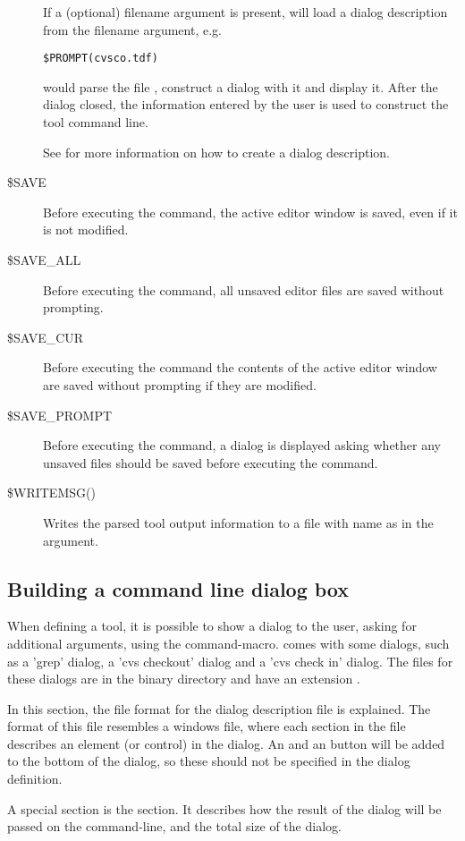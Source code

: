\begin{description}
If a (optional) filename argument is present,  will load
a dialog description from the filename argument, e.g.
\begin{verbatim}
$PROMPT(cvsco.tdf)
\end{verbatim}
would parse the file , construct a dialog with it and
display it. After the dialog closed, the information entered by the user
is used to construct the tool command line.

See  for more information on how to create a dialog
description.
\item[\$SAVE]
Before executing the command, the active editor window is saved, even if it is not modified.
\item[\$SAVE\_ALL]
Before executing the command, all unsaved editor files are saved without prompting.
\item[\$SAVE\_CUR]
Before executing the command the contents of the active editor window are
saved without prompting if they are modified.
\item[\$SAVE\_PROMPT]
Before executing the command, a dialog is displayed asking whether any
unsaved files should be saved before executing the command.
\item[\$WRITEMSG()]
Writes the parsed tool output information to a file with name as in the argument.
\end{description}	

\subsection{Building a command line dialog box}
\label{se:commanddialogs}
When defining a tool, it is possible to show a dialog to the user, asking for
additional arguments, using the  command-macro.
\fpc comes with some dialogs, such as a 'grep' dialog, a 'cvs checkout' dialog
and a 'cvs check in' dialog. The files for these dialogs are in the binary
directory and have an extension .

In this section, the file format for the dialog description file is explained.
The format of this file resembles a windows  file, where each section
in the file describes an element (or control) in the dialog.
An  and an  button will be added to the bottom of the dialog,
so these should not be specified in the dialog definition.

A special section is the  section. It describes how the result of
the dialog will be passed on the command-line, and the total size of the dialog.


